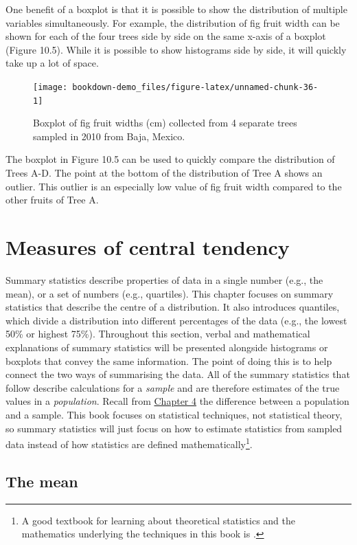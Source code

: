 \documentclass[
  openany]{krantz}
\begin{document}
One benefit of a boxplot is that it is possible to show the distribution of multiple variables simultaneously.
For example, the distribution of fig fruit width can be shown for each of the four trees side by side on the same x-axis of a boxplot (Figure 10.5).
While it is possible to show histograms side by side, it will quickly take up a lot of space.

\begin{figure}
\texttt{[image: bookdown-demo\_files/figure-latex/unnamed-chunk-36-1]} \caption{Boxplot of fig fruit widths (cm) collected from 4 separate trees sampled in 2010 from Baja, Mexico.}\label{fig:unnamed-chunk-36}
\end{figure}

The boxplot in Figure 10.5 can be used to quickly compare the distribution of Trees A-D.
The point at the bottom of the distribution of Tree A shows an outlier.
This outlier is an especially low value of fig fruit width compared to the other fruits of Tree A.

\hypertarget{Chapter_11}{%
\chapter{Measures of central tendency}\label{Chapter_11}}

Summary statistics describe properties of data in a single number (e.g., the mean), or a set of numbers (e.g., quartiles).
This chapter focuses on summary statistics that describe the centre of a distribution.
It also introduces quantiles, which divide a distribution into different percentages of the data (e.g., the lowest 50\% or highest 75\%).
Throughout this section, verbal and mathematical explanations of summary statistics will be presented alongside histograms or boxplots that convey the same information.
The point of doing this is to help connect the two ways of summarising the data.
All of the summary statistics that follow describe calculations for a \emph{sample} and are therefore estimates of the true values in a \emph{population}.
Recall from \protect\hyperlink{Chapter_4}{Chapter 4} the difference between a population and a sample.
This book focuses on statistical techniques, not statistical theory, so summary statistics will just focus on how to estimate statistics from sampled data instead of how statistics are defined mathematically\footnote{A good textbook for learning about theoretical statistics and the mathematics underlying the techniques in this book is \citet{Miller2004}.}.

\hypertarget{the-mean}{%
\section{The mean}\label{the-mean}}
\end{document}
